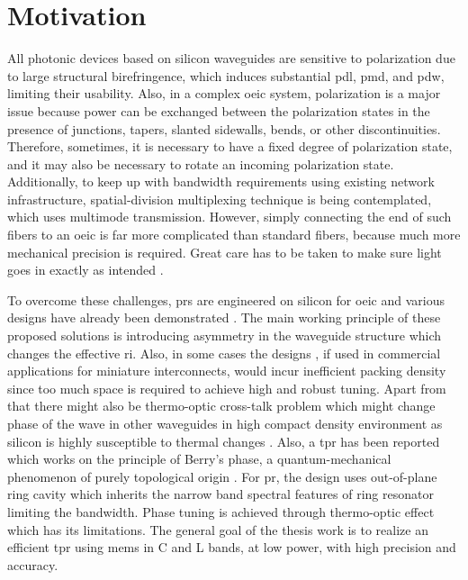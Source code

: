 \documentclass[../report.tex]{subfiles}
\begin{document}
	\section{Motivation} 
All photonic devices based on silicon waveguides are sensitive to polarization due to large structural birefringence, which induces substantial \gls{pdl}, \gls{pmd}, and \gls{pdw}, limiting their usability. Also, in a complex \gls{oeic} system, polarization is a major issue because power can be exchanged between the polarization states in the presence of junctions, tapers, slanted sidewalls, bends, or other discontinuities. Therefore, sometimes, it is necessary to have a fixed degree of polarization state, and it may also be necessary to rotate an incoming polarization state.  Additionally, to keep up with bandwidth requirements using existing network infrastructure, spatial-division multiplexing technique \cite{space_richardson_2013} is being contemplated, which uses multimode transmission. However, simply connecting the end of such fibers to an \gls{oeic} is far more complicated than standard fibers, because much more mechanical precision is required. Great care has to be taken to make sure light goes in exactly as intended \cite{hecht_is_2016}.\par

To overcome these challenges, \gls{pr}s are engineered on silicon for \gls{oeic} and various designs have already been demonstrated \cite{xie_efficient_2015,velasco_ultracompact_2012,leung_numerical_2011,wang_design_2014,dai_novel_2011,wirth_efficient_2012,chen_compact_2011}. The main working principle of these proposed solutions is introducing asymmetry in the waveguide structure which changes the effective \gls{ri}. Also, in some cases the designs \cite{sarmiento-merenguel_demonstration_2015}, if used in commercial applications for miniature interconnects, would incur inefficient packing density since too much space is required to achieve high and robust tuning. Apart from that there might also be thermo-optic cross-talk problem which might change phase of the wave in other waveguides in high compact density environment as silicon is highly susceptible to thermal changes \cite{ibrahim_athermal_2012}. Also, a \gls{tpr} has been reported which works on the principle of Berry’s phase, a quantum-mechanical phenomenon of purely topological origin \cite{xu_electrically_2014}. For \gls{pr}, the design uses out-of-plane ring cavity which inherits the narrow band spectral features of ring resonator limiting the bandwidth. Phase tuning is achieved through thermo-optic effect which has its limitations. The general goal of the thesis work is to realize an efficient \gls{tpr} using \gls{mems} in C and L bands, at low power, with high precision and accuracy.    
\end{document}

